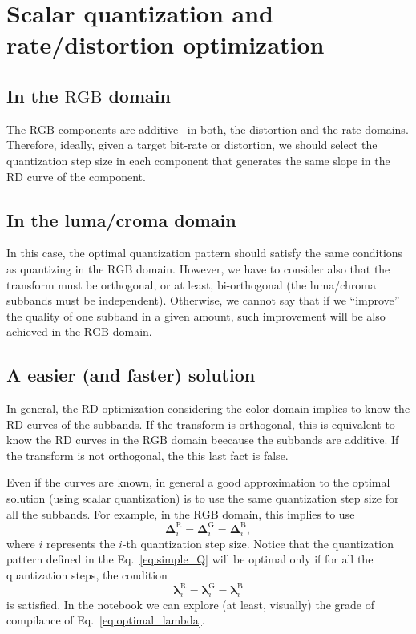 \section{Scalar quantization and rate/distortion optimization}

\subsection{In the $\text{RGB}$ domain}

The $\text{RGB}$ components are additive~\cite{burger2016digital} in
both, the distortion and the rate domains. Therefore, ideally, given a
target bit-rate or distortion, we should select the quantization step
size in each component that generates the same slope in the RD curve
of the component.

\subsection{In the luma/croma domain}

In this case, the optimal quantization pattern should satisfy the same
conditions as quantizing in the $\text{RGB}$ domain. However, we have
to consider also that the transform must be orthogonal, or at least,
bi-orthogonal (the luma/chroma subbands must be
independent). Otherwise, we cannot say that if we ``improve'' the
quality of one subband in a given amount, such improvement will be
also achieved in the $\text{RGB}$ domain.

\subsection{A easier (and faster) solution}

In general, the RD optimization considering the color domain implies
to know the RD curves of the subbands. If the transform is orthogonal,
this is equivalent to know the RD curves in the $\text{RGB}$ domain
beecause the subbands are additive. If the transform is not
orthogonal, the this last fact is false.

Even if the curves are known, in general a good approximation to the
optimal solution (using scalar quantization) is to use the same
quantization step size for all the subbands. For example, in the
$\text{RGB}$ domain, this implies to use
\begin{equation}
  \mathbf{\Delta}^{\text{R}}_i = \mathbf{\Delta}^{\text{G}}_i =
  \mathbf{\Delta}^{\text{B}}_i,
  \label{eq:simple_Q}
\end{equation}
where $i$ represents the $i$-th quantization step size. Notice that
the quantization pattern defined in the Eq.~\eqref{eq:simple_Q} will
be optimal only if for all the quantization steps, the condition
\begin{equation}
  \mathbf{\lambda}^{\text{R}}_i = \mathbf{\lambda}^{\text{G}}_i =
  \mathbf{\lambda}^{\text{B}}_i
  \label{eq:optimal_lambda}
\end{equation}
is satisfied. In the notebook \href{https://github.com/Sistemas-Multimedia/Sistemas-Multimedia.github.io/blob/master/contents/RGB_SQ/RGB_SQ.ipynb}{} we can explore (at least, visually) the grade of compilance of
Eq.~\eqref{eq:optimal_lambda}.

